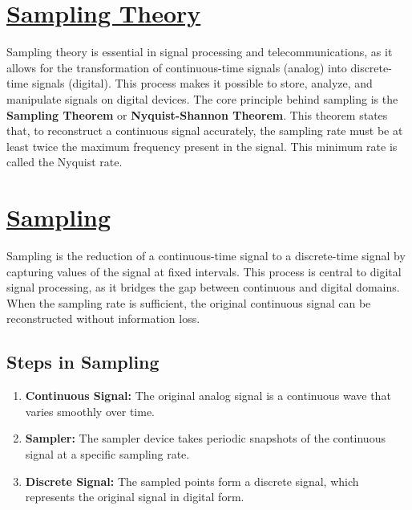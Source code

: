 \documentclass[12pt,a4paper]{report}
\begin{document}

    \newpage

    \section*{\underline{\textbf{Sampling Theory}}}

    Sampling theory is essential in signal processing and telecommunications, as it allows for the transformation of continuous-time signals (analog) into discrete-time signals (digital). This process makes it possible to store, analyze, and manipulate signals on digital devices. The core principle behind sampling is the \textbf{Sampling Theorem} or \textbf{Nyquist-Shannon Theorem}. This theorem states that, to reconstruct a continuous signal accurately, the sampling rate must be at least twice the maximum frequency present in the signal. This minimum rate is called the Nyquist rate.

    \section*{\underline{\textbf{Sampling}}}

    Sampling is the reduction of a continuous-time signal to a discrete-time signal by capturing values of the signal at fixed intervals. This process is central to digital signal processing, as it bridges the gap between continuous and digital domains. When the sampling rate is sufficient, the original continuous signal can be reconstructed without information loss.

    \subsection*{\textbf{Steps in Sampling}}
    \begin{enumerate}
        \item \textbf{Continuous Signal:} The original analog signal is a continuous wave that varies smoothly over time.
        \item \textbf{Sampler:} The sampler device takes periodic snapshots of the continuous signal at a specific sampling rate.
        \item \textbf{Discrete Signal:} The sampled points form a discrete signal, which represents the original signal in digital form.
    \end{enumerate}
\end{document}
